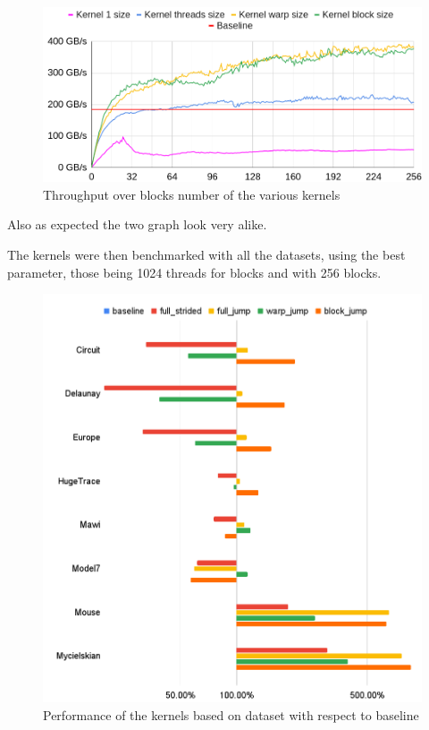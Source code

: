 \documentclass[conference]{IEEEtran}
\begin{document}
\begin{figure}[h!]
	\centering
	\includegraphics[width=1\linewidth]{data_images/Gb_for_size_grid_2}
	\caption{Throughput over blocks number of the various kernels}
	\label{fig:gbforsizegrid2}
\end{figure}

\FloatBarrier
Also as expected the two graph look very alike.

The kernels were then benchmarked with all the datasets, using the best parameter, those being 1024 threads for blocks and with 256 blocks.

\begin{figure}[h!]
	\centering
	\includegraphics[width=0.9\linewidth]{data_images/perf_gpu}
	\caption{Performance of the kernels based on dataset with respect to baseline}
	\label{fig:perf-gpu}
\end{figure}
\end{document}
